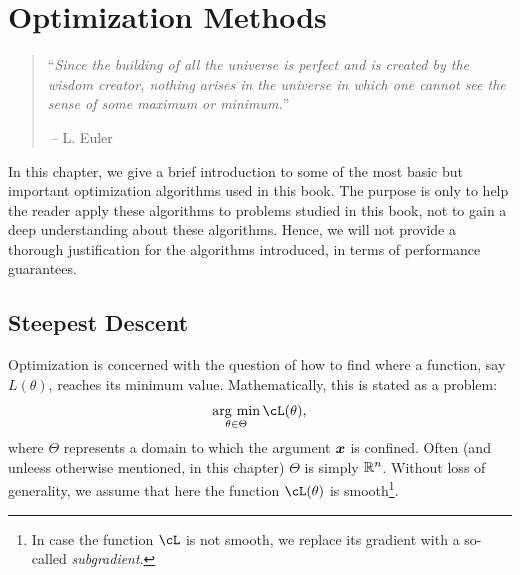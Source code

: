 \documentclass[../../book-main.tex]{subfiles}
\begin{document}
\chapter{Optimization Methods}
\label{app:optimization}

\begin{quote}
``{\em Since the building of all the universe is perfect and is created by the wisdom creator, nothing arises in the universe in which one cannot see the sense of some maximum or minimum.}''

$~$\hfill -- L. Euler
 \end{quote}
\vspace{5mm}

In this chapter, we give a brief introduction to some of the most basic but important optimization algorithms used in this book. The purpose is only to help the reader apply these algorithms to problems studied in this book, not to gain a deep understanding about these algorithms. Hence, we will not provide a thorough justification for the algorithms introduced, in terms of  performance guarantees. 

\section{Steepest Descent}


Optimization is concerned with the question of how to find where a function, say $L(\theta)$, reaches its minimum value. Mathematically, this is stated as a problem:
\begin{equation}
    \argmin_{\theta \in \Theta} \cL(\theta),
\end{equation}
where $\Theta$ represents a domain to which the argument $\bm{x}$ is confined. Often (and unleess otherwise mentioned, in this chapter) $\Theta$ is simply $\mathbb{R}^n$. Without loss of generality, we assume that here the function $\cL(\theta)$ is smooth\footnote{In case the function \(\cL\) is not smooth, we replace its gradient with a so-called \textit{subgradient}.}. 
\end{document}
